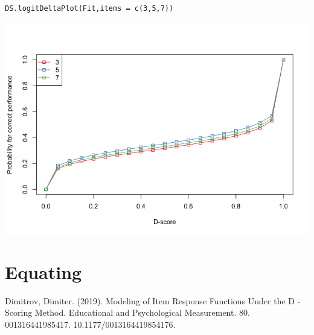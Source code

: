\documentclass[10pt,a4paper]{article}
\begin{document}
\begin{lstlisting}
DS.logitDeltaPlot(Fit,items = c(3,5,7))
\end{lstlisting}

\includegraphics[scale=0.5]{icc.png}

\section{Equating}


\begin{thebibliography}{9}
 Dimitrov, Dimiter. (2019). Modeling of Item Response Functions Under the D -Scoring Method. Educational and Psychological Measurement. 80. 001316441985417. 10.1177/0013164419854176. 
\end{thebibliography}
\end{document}
